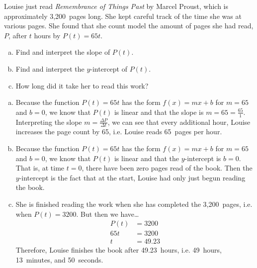 \documentclass[11pt,letterpaper]{article}
\begin{document}

 Louise just read \textit{Remembrance of Things Past} by Marcel Proust, which is approximately 3,200~pages long. She kept careful track of the time she was at various pages. She found that she count model the amount of pages she had read, $P$, after $t$ hours by $P(t)= 65t$.
	\begin{enumerate}[(a)]
	\item Find and interpret the slope of $P(t)$.
	\item Find and interpret the $y$-intercept of $P(t)$.
	\item How long did it take her to read this work?
	\end{enumerate} \pspace

\sol 
\begin{enumerate}[(a)]
\item Because the function $P(t)= 65t$ has the form $f(x)= mx + b$ for $m= 65$ and $b= 0$, we know that $P(t)$ is linear and that the slope is $m= 65= \frac{65}{1}$. Interpreting the slope $m= \frac{\Delta P}{\Delta t}$, we can see that every additional hour, Louise increases the page count by 65, i.e. Louise reads 65~pages per hour. \pspace

\item Because the function $P(t)= 65t$ has the form $f(x)= mx + b$ for $m= 65$ and $b= 0$, we know that $P(t)$ is linear and that the $y$-intercept is $b= 0$. That is, at time $t= 0$, there have been zero pages read of the book. Then the $y$-intercept is the fact that at the start, Louise had only just begun reading the book. \pspace

\item She is finished reading the work when she has completed the 3,200~pages, i.e. when $P(t)= 3200$. But then we have\dots
	\[
	\begin{aligned}
	P(t)&= 3200 \\[0.3cm]
	65t&= 3200 \\[0.3cm]
	t&= 49.23
	\end{aligned}
	\]
Therefore, Louise finishes the book after 49.23~hours, i.e. 49~hours, 13~minutes, and 50~seconds. 
\end{enumerate}



\newpage
\end{document}
